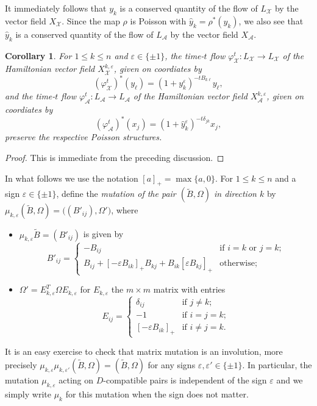 \documentclass{amsart}
\newtheorem{corollary}[theorem]{Corollary}
\numberwithin{equation}{section}
\newcommand{\cA}{\mathcal{A}}
\newcommand{\cX}{\mathcal{X}}
\renewcommand{\max}{\operatorname{max}}
\begin{document}
It immediately follows that $y_k$ is a conserved quantity of the flow of $L_\cX$ by the vector field $X_\cX$.
Since the map $\rho$ is Poisson with $\hat y_k=\rho^*(y_k)$, we also see that $\hat y_k$ is a conserved quantity of the flow of $L_\cA$ by the vector field $X_\cA$.
\begin{corollary}
  \label{cor:time-one flows}
  For $1\le k\le n$ and $\varepsilon\in\{\pm1\}$, the time-$t$ flow $\varphi_\cX^t:L_\cX\to L_\cX$ of the Hamiltonian vector field $X_\cX^{k,\varepsilon}$, given on coordiates by
  \[(\varphi_\cX^t)^*(y_\ell)=(1+y_k^\varepsilon)^{-tB_{k\ell}}y_\ell,\]
  and the time-$t$ flow $\varphi_\cA^t:L_\cA\to L_\cA$ of the Hamiltonian vector field $X_\cA^{k,\varepsilon}$, given on coordiates by
  \[(\varphi_\cA^t)^*(x_j)=(1+\hat y_k^\varepsilon)^{-t\delta_{jk}}x_j,\]
  preserve the respective Poisson structures.
\end{corollary}
\begin{proof}
  This is immediate from the preceding discussion.
\end{proof}

In what follows we use the notation $[a]_+=\max\{a,0\}$.
For $1\le k\le n$ and a sign $\varepsilon\in\{\pm1\}$, define the \emph{mutation of the pair $(\tilde B,\Omega)$ in direction $k$} by $\mu_{k,\varepsilon}(\tilde B,\Omega)=\big((B'_{ij}),\Omega'\big)$, where
\begin{itemize}
  \item $\mu_{k,\varepsilon}\tilde B=(B'_{ij})$ is given by
    \[B'_{ij}=\begin{cases}-B_{ij} & \text{if $i=k$ or $j=k$;}\\ B_{ij}+[-\varepsilon B_{ik}]_+B_{kj}+B_{ik}[\varepsilon B_{kj}]_+ & \text{otherwise;}\end{cases}\]
  \item $\Omega'=E_{k,\varepsilon}^T\Omega E_{k,\varepsilon}$ for $E_{k,\varepsilon}$ the $m\times m$ matrix with entries
    \[E_{ij}=\begin{cases}\delta_{ij} & \text{if $j\ne k$;}\\ -1 & \text{if $i=j=k$;}\\ [-\varepsilon B_{ik}]_+ & \text{if $i\ne j=k$.}\end{cases}\]
\end{itemize}
It is an easy exercise to check that matrix mutation is an involution, more precisely $\mu_{k,\varepsilon}\mu_{k,\varepsilon'}(\tilde B,\Omega)=(\tilde B,\Omega)$ for any signs $\varepsilon,\varepsilon'\in\{\pm1\}$.
In particular, the mutation $\mu_{k,\varepsilon}$ acting on $D$-compatible pairs is independent of the sign $\varepsilon$ and we simply write $\mu_k$ for this mutation when the sign does not matter.
\end{document}
